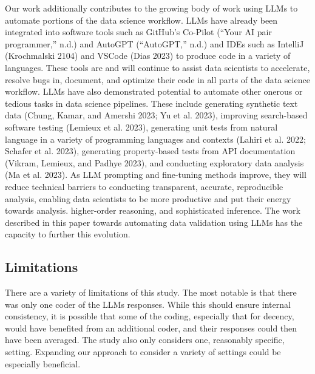 \documentclass[
  letterpaper,
  DIV=11,
  numbers=noendperiod]{scrartcl}
\begin{document}
Our work additionally contributes to the growing body of work using LLMs
to automate portions of the data science workflow. LLMs have already
been integrated into software tools such as GitHub's Co-Pilot ({``{Your
AI pair programmer},''} n.d.) and AutoGPT ({``{AutoGPT},''} n.d.) and
IDEs such as IntelliJ (Krochmalski 2104) and VSCode (Dias 2023) to
produce code in a variety of languages. These tools are and will
continue to assist data scientists to accelerate, resolve bugs in,
document, and optimize their code in all parts of the data science
workflow. LLMs have also demonstrated potential to automate other
onerous or tedious tasks in data science pipelines. These include
generating synthetic text data (Chung, Kamar, and Amershi 2023; Yu et
al. 2023), improving search-based software testing (Lemieux et al.
2023), generating unit tests from natural language in a variety of
programming languages and contexts (Lahiri et al. 2022; Schafer et al.
2023), generating property-based tests from API documentation (Vikram,
Lemieux, and Padhye 2023), and conducting exploratory data analysis (Ma
et al. 2023). As LLM prompting and fine-tuning methods improve, they
will reduce technical barriers to conducting transparent, accurate,
reproducible analysis, enabling data scientists to be more productive
and put their energy towards analysis. higher-order reasoning, and
sophisticated inference. The work described in this paper towards
automating data validation using LLMs has the capacity to further this
evolution.

\hypertarget{limitations}{%
\subsection{Limitations}\label{limitations}}

There are a variety of limitations of this study. The most notable is
that there was only one coder of the LLMs responses. While this should
ensure internal consistency, it is possible that some of the coding,
especially that for decency, would have benefited from an additional
coder, and their responses could then have been averaged. The study also
only considers one, reasonably specific, setting. Expanding our approach
to consider a variety of settings could be especially beneficial.
\end{document}
